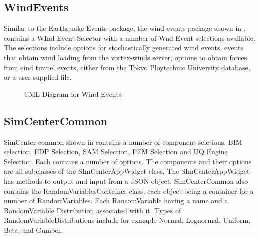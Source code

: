  

\subsection{WindEvents}
Similar to the Earthquake Events package, the wind events package shown in , contains a WInd Event Selector with a number of Wnd Event selections available. The selections include options for stochastically generated wind events, events that obtain wind loading from the vortex-winds server, options to obtain forces from eind tunnel events, either from the Tokyo Ploytechnic University database, or a user supplied file.

 
  \begin{figure}[!htbp]
  \caption{UML Diagram for Wind Events}
  \label{fig:umlWindEvents}
\end{figure}
 

\subsection{SimCenterCommon}
SimCenter common shown in  contains a number of component selctions, BIM selection, EDP Selection, SAM Selection, FEM Selection and UQ Engine Selection. Each contains a number of options. The components and their options are all subclasses of the SImCenterAppWidget class, The SImCenterAppWidget has methods to output and input from a JSON object. SimCenterCommon also contains the RandomVariablesContainer class, each object being a container for a number of RandomVariables. Each RansomVariable having a name and a RandomVariable Distribution associated with it. Types of RandomVariableDistributions include for exmaple Normal, Lognormal, Uniform, Beta, and Gumbel.


